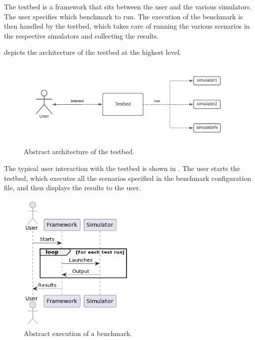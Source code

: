\documentclass[12pt,a4paper,openright,twoside]{book}
\begin{document}
The testbed is a framework that sits between the user and the various simulators.
The user specifies which benchmark to run.
The execution of the benchmark is then handled by the testbed, which takes care of running the various scenarios in the respective simulators and collecting the results.

 depicts the architecture of the testbed at the highest level.

\begin{figure}[h!]
  \centering
  \includegraphics[width=\textwidth]{figures/architecture-high-level.pdf}
  \caption{Abstract architecture of the testbed.}
  \label{fig:high-level-architecture}
\end{figure}

The typical user interaction with the testbed is shown in .
The user starts the testbed, which executes all the scenarios specified in the benchmark configuration file, and then displays the results to the user.

\begin{figure}[h!]
  \centering
  \includegraphics[width=0.5\textwidth]{figures/execution-high-level.png}
  \caption{Abstract execution of a benchmark.}
  \label{fig:high-level-execution}
\end{figure}
\end{document}
